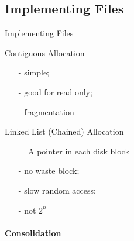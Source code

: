 \subsection{Implementing Files}

\begin{frame}{Implementing Files}
  \begin{description}
  \item[Contiguous Allocation] 
  \end{description}
    \begin{center}
       
    \end{center}
  \begin{multicols}{2}
    \begin{itemize}
    \item[-] simple;
    \item[-] good for read only;
    \item[-] fragmentation
    \end{itemize}
  \end{multicols}
\end{frame}

\begin{frame}
  \begin{description}
  \item[Linked List (Chained) Allocation] A pointer in each disk block
  \end{description}
  \begin{center}
  \end{center}
  \begin{multicols}{3}
    \begin{itemize}
    \item[-] no waste block;
    \item[-] slow random access;
    \item[-] not $2^n$
    \end{itemize}
  \end{multicols}
\end{frame}

\paragraph{Consolidation}

